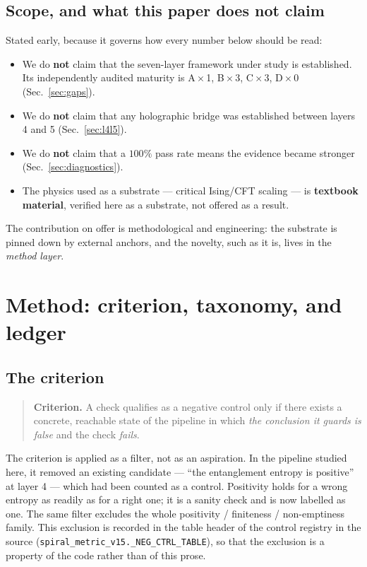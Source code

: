 \documentclass[11pt,a4paper]{article}
\newcommand{\code}[1]{\texttt{\small #1}}
\begin{document}
\subsection{Scope, and what this paper does not claim}
\label{sec:nonclaims}

Stated early, because it governs how every number below should be read:

\begin{itemize}[leftmargin=1.4em,itemsep=2pt]
  \item We do \textbf{not} claim that the seven-layer framework under study is
        established. Its independently audited maturity is A\,$\times$\,1,
        B\,$\times$\,3, C\,$\times$\,3, D\,$\times$\,0 (Sec.~\ref{sec:gaps}).
  \item We do \textbf{not} claim that any holographic bridge was established
        between layers 4 and 5 (Sec.~\ref{sec:l4l5}).
  \item We do \textbf{not} claim that a $100\%$ pass rate means the evidence
        became stronger (Sec.~\ref{sec:diagnostics}).
  \item The physics used as a substrate --- critical Ising/CFT scaling --- is
        \textbf{textbook material}, verified here as a substrate, not offered as a
        result.
\end{itemize}

The contribution on offer is methodological and engineering: the substrate is
pinned down by external anchors, and the novelty, such as it is, lives in the
\emph{method layer}.

\section{Method: criterion, taxonomy, and ledger}
\label{sec:method}

\subsection{The criterion}
\label{sec:criterion}

\begin{quote}
\textbf{Criterion.} A check qualifies as a negative control only if there exists a
concrete, reachable state of the pipeline in which \emph{the conclusion it guards
is false} and the check \emph{fails}.
\end{quote}

The criterion is applied as a filter, not as an aspiration. In the pipeline studied
here, it removed an existing candidate --- ``the entanglement entropy is positive''
at layer 4 --- which had been counted as a control. Positivity holds for a wrong
entropy as readily as for a right one; it is a sanity check and is now labelled as
one. The same filter excludes the whole positivity / finiteness / non-emptiness
family. This exclusion is recorded in the table header of the control registry in
the source (\code{spiral\_metric\_v15.\_NEG\_CTRL\_TABLE}), so that the exclusion
is a property of the code rather than of this prose.
\end{document}
